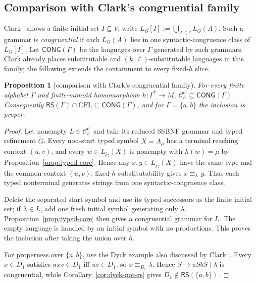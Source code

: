 \documentclass[11pt,a4paper]{article}
\newtheorem{proposition}[theorem]{Proposition}
\theoremstyle{remark}
\theoremstyle{plain}
\newcommand{\cf}{\mathrm{cf}}
\newcommand{\Ccf}[1]{\mathcal C_{#1}^{\cf}}
\begin{document}
\subsection{Comparison with Clark's congruential family}

Clark~\cite{clark2010congruential} allows a finite initial set
$I\subseteq V$; write $L_G[I]:=\bigcup_{A\in I}L_G(A)$.  Such a grammar is
\emph{congruential} if each $L_G(A)$ lies in one syntactic-congruence class
of $L_G[I]$.  Let $\mathsf{CONG}(\Gamma)$ be the languages over $\Gamma$
generated by such grammars.  Clark already places substitutable and
$(k,\ell)$-substitutable languages in this family; the following extends
the containment to every fixed-$h$ slice.

\begin{proposition}[comparison with Clark's congruential family]
\label{prop:clark-congruential-comparison}
For every finite alphabet $\Gamma$ and finite-monoid homomorphism
$h:\Gamma^*\to M$,
$\Ccf{h}\subseteq\mathsf{CONG}(\Gamma)$.  Consequently
$\mathsf{RS}(\Gamma)\cap\mathrm{CFL}
\subseteq\mathsf{CONG}(\Gamma)$, and for $\Gamma=\{a,b\}$ the
inclusion is proper.
\end{proposition}

\begin{proof}
Let nonempty $L\in\Ccf{h}$ and take its reduced SSBNF grammar and typed
refinement $\widetilde G$.  Every non-start typed symbol $X=A_\mu$ has a
terminal reaching context $(u,v)$, and every
$w\in L_{\widetilde G}(X)$ is nonempty with $h(w)=\mu$ by
Proposition~\ref{prop:typed-core}.  Hence any
$x,y\in L_{\widetilde G}(X)$ have the same type and the common context
$(u,v)$; fixed-$h$ substitutability gives $x\equiv_L y$.  Thus each typed
nonterminal generates strings from one syntactic-congruence class.

Delete the separated start symbol and use its typed successors as the finite
initial set; if $\lambda\in L$, add one fresh initial symbol generating only
$\lambda$.  Proposition~\ref{prop:typed-core} then gives a congruential
grammar for $L$.  The empty language is handled by an initial symbol with no
productions.  This proves the inclusion after taking the union over $h$.

For properness over $\{a,b\}$, use the Dyck example also discussed by
Clark~\cite{clark2010congruential}.  Every $x\in D_1$ satisfies
$uxv\in D_1$ iff $uv\in D_1$, so $x\equiv_{D_1}\lambda$.  Hence
$S\to aSbS\mid\lambda$ is congruential, while
Corollary~\ref{cor:dyck-not-rs} gives
$D_1\notin\mathsf{RS}(\{a,b\})$.
\end{proof}
\end{document}
